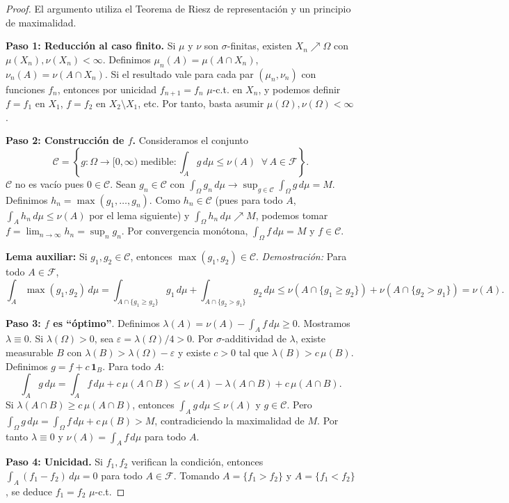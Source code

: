 \documentclass[11pt,a4paper]{article}
\theoremstyle{plain}
\theoremstyle{definition}
\begin{document}
\begin{proof}
El argumento utiliza el Teorema de Riesz de representación y un principio de maximalidad.

\textbf{Paso 1: Reducción al caso finito.} Si $\mu$ y $\nu$ son $\sigma$-finitas, existen $X_{n}\nearrow\Omega$ con $\mu(X_{n}),\nu(X_{n})<\infty$. Definimos $\mu_{n}(A)=\mu(A\cap X_{n})$, $\nu_{n}(A)=\nu(A\cap X_{n})$. Si el resultado vale para cada par $(\mu_{n},\nu_{n})$ con funciones $f_{n}$, entonces por unicidad $f_{n+1}=f_{n}$ $\mu$-c.t. en $X_{n}$, y podemos definir $f=f_{1}$ en $X_{1}$, $f=f_{2}$ en $X_{2}\setminus X_{1}$, etc. Por tanto, basta asumir $\mu(\Omega),\nu(\Omega)<\infty$.

\textbf{Paso 2: Construcción de $f$.} Consideramos el conjunto
\[
\mathcal{C}=\left\{g:\Omega\to[0,\infty)\;\text{medible}:\int_{A}g\,d\mu\le\nu(A)\;\;\forall\,A\in\mathcal{F}\right\}.
\]
$\mathcal{C}$ no es vacío pues $0\in\mathcal{C}$. Sean $g_{n}\in\mathcal{C}$ con $\int_{\Omega}g_{n}\,d\mu\to\sup_{g\in\mathcal{C}}\int_{\Omega}g\,d\mu=M$. Definimos $h_{n}=\max(g_{1},\dots,g_{n})$. Como $h_{n}\in\mathcal{C}$ (pues para todo $A$, $\int_{A}h_{n}\,d\mu\le\nu(A)$ por el lema siguiente) y $\int_{\Omega}h_{n}\,d\mu\nearrow M$, podemos tomar $f=\lim_{n\to\infty}h_{n}=\sup_{n}g_{n}$. Por convergencia monótona, $\int_{\Omega}f\,d\mu=M$ y $f\in\mathcal{C}$.

\textbf{Lema auxiliar:} Si $g_{1},g_{2}\in\mathcal{C}$, entonces $\max(g_{1},g_{2})\in\mathcal{C}$. \emph{Demostración:} Para todo $A\in\mathcal{F}$,
\[
\int_{A}\max(g_{1},g_{2})\,d\mu
=\int_{A\cap\{g_{1}\ge g_{2}\}}g_{1}\,d\mu+\int_{A\cap\{g_{2}>g_{1}\}}g_{2}\,d\mu
\le\nu(A\cap\{g_{1}\ge g_{2}\})+\nu(A\cap\{g_{2}>g_{1}\})=\nu(A).
\]

\textbf{Paso 3: $f$ es ``óptimo''}. Definimos $\lambda(A)=\nu(A)-\int_{A}f\,d\mu\ge 0$. Mostramos $\lambda\equiv 0$. Si $\lambda(\Omega)>0$, sea $\varepsilon=\lambda(\Omega)/4>0$. Por $\sigma$-additividad de $\lambda$, existe measurable $B$ con $\lambda(B)>\lambda(\Omega)-\varepsilon$ y existe $c>0$ tal que $\lambda(B)>c\,\mu(B)$. Definimos $g=f+c\,\mathbf{1}_{B}$. Para todo $A$:
\[
\int_{A}g\,d\mu=\int_{A}f\,d\mu+c\,\mu(A\cap B)\le\nu(A)-\lambda(A\cap B)+c\,\mu(A\cap B).
\]
Si $\lambda(A\cap B)\ge c\,\mu(A\cap B)$, entonces $\int_{A}g\,d\mu\le\nu(A)$ y $g\in\mathcal{C}$. Pero $\int_{\Omega}g\,d\mu=\int_{\Omega}f\,d\mu+c\,\mu(B)>M$, contradiciendo la maximalidad de $M$. Por tanto $\lambda\equiv 0$ y $\nu(A)=\int_{A}f\,d\mu$ para todo $A$.

\textbf{Paso 4: Unicidad.} Si $f_{1},f_{2}$ verifican la condición, entonces $\int_{A}(f_{1}-f_{2})\,d\mu=0$ para todo $A\in\mathcal{F}$. Tomando $A=\{f_{1}>f_{2}\}$ y $A=\{f_{1}<f_{2}\}$, se deduce $f_{1}=f_{2}$ $\mu$-c.t.
\end{proof}
\end{document}
